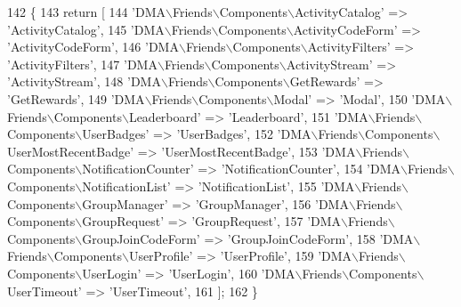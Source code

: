 \begin{DoxyCode}
142     \{
143         \textcolor{keywordflow}{return} [
144             \textcolor{stringliteral}{'DMA\(\backslash\)Friends\(\backslash\)Components\(\backslash\)ActivityCatalog'}            => \textcolor{stringliteral}{'ActivityCatalog'},
145             \textcolor{stringliteral}{'DMA\(\backslash\)Friends\(\backslash\)Components\(\backslash\)ActivityCodeForm'}           => \textcolor{stringliteral}{'ActivityCodeForm'},
146             \textcolor{stringliteral}{'DMA\(\backslash\)Friends\(\backslash\)Components\(\backslash\)ActivityFilters'}            => \textcolor{stringliteral}{'ActivityFilters'},
147             \textcolor{stringliteral}{'DMA\(\backslash\)Friends\(\backslash\)Components\(\backslash\)ActivityStream'}             => \textcolor{stringliteral}{'ActivityStream'},
148             \textcolor{stringliteral}{'DMA\(\backslash\)Friends\(\backslash\)Components\(\backslash\)GetRewards'}                 => \textcolor{stringliteral}{'GetRewards'},
149             \textcolor{stringliteral}{'DMA\(\backslash\)Friends\(\backslash\)Components\(\backslash\)Modal'}                      => \textcolor{stringliteral}{'Modal'},
150             \textcolor{stringliteral}{'DMA\(\backslash\)Friends\(\backslash\)Components\(\backslash\)Leaderboard'}                => \textcolor{stringliteral}{'Leaderboard'},
151             \textcolor{stringliteral}{'DMA\(\backslash\)Friends\(\backslash\)Components\(\backslash\)UserBadges'}                 => \textcolor{stringliteral}{'UserBadges'},
152             \textcolor{stringliteral}{'DMA\(\backslash\)Friends\(\backslash\)Components\(\backslash\)UserMostRecentBadge'}        => \textcolor{stringliteral}{'UserMostRecentBadge'},
153             \textcolor{stringliteral}{'DMA\(\backslash\)Friends\(\backslash\)Components\(\backslash\)NotificationCounter'}        => \textcolor{stringliteral}{'NotificationCounter'},
154             \textcolor{stringliteral}{'DMA\(\backslash\)Friends\(\backslash\)Components\(\backslash\)NotificationList'}           => \textcolor{stringliteral}{'NotificationList'},
155             \textcolor{stringliteral}{'DMA\(\backslash\)Friends\(\backslash\)Components\(\backslash\)GroupManager'}               => \textcolor{stringliteral}{'GroupManager'},               
156             \textcolor{stringliteral}{'DMA\(\backslash\)Friends\(\backslash\)Components\(\backslash\)GroupRequest'}               => \textcolor{stringliteral}{'GroupRequest'},
157             \textcolor{stringliteral}{'DMA\(\backslash\)Friends\(\backslash\)Components\(\backslash\)GroupJoinCodeForm'}          => \textcolor{stringliteral}{'GroupJoinCodeForm'},
158             \textcolor{stringliteral}{'DMA\(\backslash\)Friends\(\backslash\)Components\(\backslash\)UserProfile'}                => \textcolor{stringliteral}{'UserProfile'},
159             \textcolor{stringliteral}{'DMA\(\backslash\)Friends\(\backslash\)Components\(\backslash\)UserLogin'}                  => \textcolor{stringliteral}{'UserLogin'},
160             \textcolor{stringliteral}{'DMA\(\backslash\)Friends\(\backslash\)Components\(\backslash\)UserTimeout'}                => \textcolor{stringliteral}{'UserTimeout'},                  
161         ];
162     \}
\end{DoxyCode}
